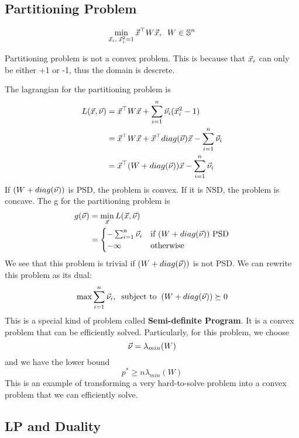 \newpage
\subsection{Partitioning Problem} %
\label{sub:partitioning_problem}

\begin{definition}
	\[
\min_{\vec{x}_i,\;\vec{x}_i^2 = 1} \vec{x}^\top W\vec{x},\;\;W\in \mathbb{S}^n
	\]
\end{definition}

\begin{remark}
	Partitioning problem is not a convex problem. This is because that $\vec{x}_i$ can only be either +1 or -1, thus the domain is descrete.
\end{remark}

The lagrangian for the partitioning problem is 
\begin{align*}
	L(\vec{x},\vec{\nu}) &= \vec{x}^\top W\vec{x} + \sum_{i=1}^n\vec{\nu}_i(\vec{x}_i^2-1)\\
	&= \vec{x}^\top W\vec{x} + \vec{x}^\top diag(\vec{\nu})\vec{x} - \sum_{i=1}^n\vec{\nu}_i\\
	&= \vec{x}^\top(W+diag(\vec{\nu}))\vec{x} - \sum_{i=1}^n\vec{\nu}_i
\end{align*}
If $(W+diag(\vec{\nu}))$ is PSD, the problem is convex. If it is NSD, the problem is concave. The g for the partitioning problem is
\begin{align*}
	g(\vec{\nu}) &= \min_{\vec{x}}L(\vec{x},\vec{\nu})\\
	&= \begin{cases}
		-\sum_{i=1}^n\vec{\nu}_i  &\text{if $(W+diag(\vec{\nu}))$ PSD}\\
		-\infty &\text{otherwise}
	\end{cases}
\end{align*}
We see that this problem is trivial if $(W+diag(\vec{\nu}))$ is not PSD. We can rewrite this problem as its dual:
\[
\max \sum_{i=1}^n\vec{\nu}_i,\;\;\text{subject to}\;\;(W+diag(\vec{\nu}))\succeq 0
\]
This is a special kind of problem called \textbf{Semi-definite Program}. It is a convex problem that can be efficiently solved. Particularly, for this problem, we choose
\[
\vec{\nu} = \lambda_{min}(W)
\]
and we have the lower bound
\[
p^* \ge n \lambda_{min}(W)
\]
This is an example of transforming a very hard-to-solve problem into a convex problem that we can efficiently solve.

\newpage 
\subsection{LP and Duality} %
\label{sub:lp_and_duality}

